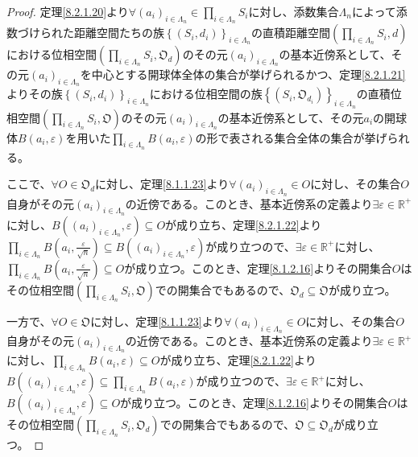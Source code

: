\documentclass[dvipdfmx]{jsarticle}
\begin{document}
\begin{proof} 定理\ref{8.2.1.20}より$\forall\left( a_{i} \right)_{i \in \varLambda_{n}} \in \prod_{i \in \varLambda_{n}} S_{i}$に対し、添数集合$\varLambda_{n}$によって添数づけられた距離空間たちの族$\left\{ \left( S_{i},d_{i} \right) \right\}_{i \in \varLambda_{n}}$の直積距離空間$\left( \prod_{i \in \varLambda_{n}} S_{i},d \right)$における位相空間$\left( \prod_{i \in \varLambda_{n}} S_{i},\mathfrak{O}_{d} \right)$のその元$\left( a_{i} \right)_{i \in \varLambda_{n}}$の基本近傍系として、その元$\left( a_{i} \right)_{i \in \varLambda_{n}}$を中心とする開球体全体の集合が挙げられるかつ、定理\ref{8.2.1.21}よりその族$\left\{ \left( S_{i},d_{i} \right) \right\}_{i \in \varLambda_{n}}$における位相空間の族$\left\{ \left( S_{i},\mathfrak{O}_{d_{i}} \right) \right\}_{i \in \varLambda_{n}}$の直積位相空間$\left( \prod_{i \in \varLambda_{n}} S_{i},\mathfrak{O} \right)$のその元$\left( a_{i} \right)_{i \in \varLambda_{n}}$の基本近傍系として、その元$a_{i}$の開球体$B\left( a_{i},\varepsilon \right)$を用いた$\prod_{i \in \varLambda_{n}} {B\left( a_{i},\varepsilon \right)}$の形で表される集合全体の集合が挙げられる。\par
ここで、$\forall O \in \mathfrak{O}_{d}$に対し、定理\ref{8.1.1.23}より$\forall\left( a_{i} \right)_{i \in \varLambda_{n}} \in O$に対し、その集合$O$自身がその元$\left( a_{i} \right)_{i \in \varLambda_{n}}$の近傍である。このとき、基本近傍系の定義より$\exists\varepsilon \in \mathbb{R}^{+}$に対し、$B\left( \left( a_{i} \right)_{i \in \varLambda_{n}},\varepsilon \right) \subseteq O$が成り立ち、定理\ref{8.2.1.22}より$\prod_{i \in \varLambda_{n}} {B\left( a_{i},\frac{\varepsilon}{\sqrt{n}} \right)} \subseteq B\left( \left( a_{i} \right)_{i \in \varLambda_{n}},\varepsilon \right)$が成り立つので、$\exists\varepsilon \in \mathbb{R}^{+}$に対し、$\prod_{i \in \varLambda_{n}} {B\left( a_{i},\frac{\varepsilon}{\sqrt{n}} \right)} \subseteq O$が成り立つ。このとき、定理\ref{8.1.2.16}よりその開集合$O$はその位相空間$\left( \prod_{i \in \varLambda_{n}} S_{i},\mathfrak{O} \right)$での開集合でもあるので、$\mathfrak{O}_{d}\subseteq \mathfrak{O}$が成り立つ。\par
一方で、$\forall O \in \mathfrak{O}$に対し、定理\ref{8.1.1.23}より$\forall\left( a_{i} \right)_{i \in \varLambda_{n}} \in O$に対し、その集合$O$自身がその元$\left( a_{i} \right)_{i \in \varLambda_{n}}$の近傍である。このとき、基本近傍系の定義より$\exists\varepsilon \in \mathbb{R}^{+}$に対し、$\prod_{i \in \varLambda_{n}} {B\left( a_{i},\varepsilon \right)} \subseteq O$が成り立ち、定理\ref{8.2.1.22}より$B\left( \left( a_{i} \right)_{i \in \varLambda_{n}},\varepsilon \right) \subseteq \prod_{i \in \varLambda_{n}} {B\left( a_{i},\varepsilon \right)}$が成り立つので、$\exists\varepsilon \in \mathbb{R}^{+}$に対し、$B\left( \left( a_{i} \right)_{i \in \varLambda_{n}},\varepsilon \right) \subseteq O$が成り立つ。このとき、定理\ref{8.1.2.16}よりその開集合$O$はその位相空間$\left( \prod_{i \in \varLambda_{n}} S_{i},\mathfrak{O}_{d} \right)$での開集合でもあるので、$\mathfrak{O \subseteq}\mathfrak{O}_{d}$が成り立つ。\par

\end{proof}
\end{document}
